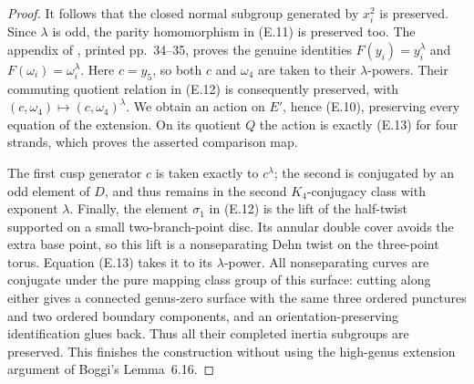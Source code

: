\begin{proof}
It follows that the closed normal subgroup generated by $x_i^2$
is preserved.  Since $\lambda$ is odd, the parity homomorphism in
(E.11) is preserved too.  The appendix of \cite{ET_HS2000},
printed pp.~34--35, proves the genuine identities
$F(y_i)=y_i^\lambda$ and $F(\omega_i)=\omega_i^\lambda$.
Here $c=y_5$, so both $c$ and $\omega_4$ are taken to their
$\lambda$-powers.  Their commuting quotient relation in (E.12)
is consequently preserved, with
$(c,\omega_4)\mapsto(c,\omega_4)^\lambda$.
We obtain an action on $E'$, hence (E.10), preserving every equation
of the extension.  On its quotient $Q$ the action is exactly (E.13)
for four strands, which proves the asserted comparison map.

The first cusp generator $c$ is taken exactly to $c^\lambda$;
the second is conjugated by an odd element of $D$, and thus remains
in the second $K_4$-conjugacy class with exponent $\lambda$.
Finally, the element $\sigma_1$ in (E.12) is the lift of the
half-twist supported on a small two-branch-point disc.  Its annular
double cover avoids the extra base point, so this lift is a
nonseparating Dehn twist on the three-point torus.  Equation (E.13)
takes it to its $\lambda$-power.  All nonseparating curves are
conjugate under the pure mapping class group of this surface:
cutting along either gives a connected genus-zero surface with the
same three ordered punctures and two ordered boundary components,
and an orientation-preserving identification glues back.  Thus all
their completed inertia subgroups are preserved.  This finishes
the construction without using the high-genus extension argument
of Boggi's Lemma~6.16.
\end{proof}

